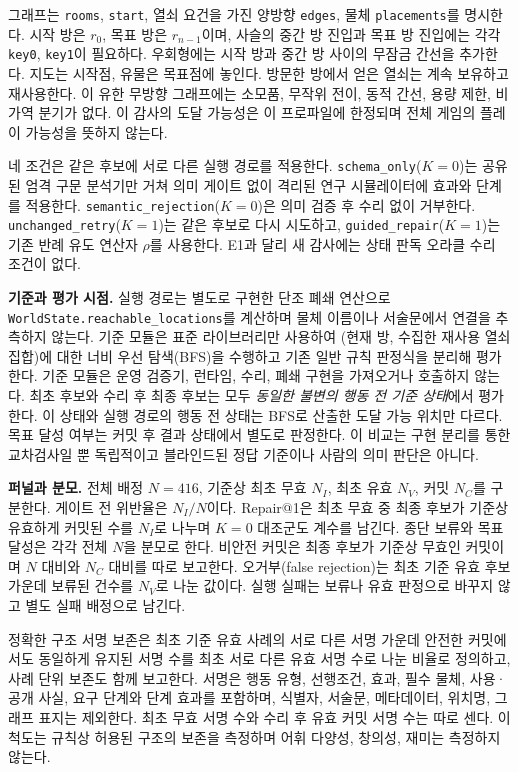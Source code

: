 \documentclass[journal]{IEEEtran}
\begin{document}
그래프는 \texttt{rooms}, \texttt{start}, 열쇠 요건을 가진 양방향 \texttt{edges}, 물체 \texttt{placements}를 명시한다. 시작 방은 $r_0$, 목표 방은 $r_{n-1}$이며, 사슬의 중간 방 진입과 목표 방 진입에는 각각 \texttt{key0}, \texttt{key1}이 필요하다. 우회형에는 시작 방과 중간 방 사이의 무잠금 간선을 추가한다. 지도는 시작점, 유물은 목표점에 놓인다. 방문한 방에서 얻은 열쇠는 계속 보유하고 재사용한다. 이 유한 무방향 그래프에는 소모품, 무작위 전이, 동적 간선, 용량 제한, 비가역 분기가 없다. 이 감사의 도달 가능성은 이 프로파일에 한정되며 전체 게임의 플레이 가능성을 뜻하지 않는다.

네 조건은 같은 후보에 서로 다른 실행 경로를 적용한다. \texttt{schema\_only}($K=0$)는 공유된 엄격 구문 분석기만 거쳐 의미 게이트 없이 격리된 연구 시뮬레이터에 효과와 단계를 적용한다. \texttt{semantic\_rejection}($K=0$)은 의미 검증 후 수리 없이 거부한다. \texttt{unchanged\_retry}($K=1$)는 같은 후보로 다시 시도하고, \texttt{guided\_repair}($K=1$)는 기존 반례 유도 연산자 $\rho$를 사용한다. E1과 달리 새 감사에는 상태 판독 오라클 수리 조건이 없다.

\noindent\textbf{기준과 평가 시점.} 실행 경로는 별도로 구현한 단조 폐쇄 연산으로 \texttt{WorldState.reachable\_locations}를 계산하며 물체 이름이나 서술문에서 연결을 추측하지 않는다. 기준 모듈은 표준 라이브러리만 사용하여 (현재 방, 수집한 재사용 열쇠 집합)에 대한 너비 우선 탐색(BFS)을 수행하고 기존 일반 규칙 판정식을 분리해 평가한다. 기준 모듈은 운영 검증기, 런타임, 수리, 폐쇄 구현을 가져오거나 호출하지 않는다. 최초 후보와 수리 후 최종 후보는 모두 \emph{동일한 불변의 행동 전 기준 상태}에서 평가한다. 이 상태와 실행 경로의 행동 전 상태는 BFS로 산출한 도달 가능 위치만 다르다. 목표 달성 여부는 커밋 후 결과 상태에서 별도로 판정한다. 이 비교는 구현 분리를 통한 교차검사일 뿐 독립적이고 블라인드된 정답 기준이나 사람의 의미 판단은 아니다.

\noindent\textbf{퍼널과 분모.} 전체 배정 $N=416$, 기준상 최초 무효 $N_I$, 최초 유효 $N_V$, 커밋 $N_C$를 구분한다. 게이트 전 위반율은 $N_I/N$이다. Repair@1은 최초 무효 중 최종 후보가 기준상 유효하게 커밋된 수를 $N_I$로 나누며 $K=0$ 대조군도 계수를 남긴다. 종단 보류와 목표 달성은 각각 전체 $N$을 분모로 한다. 비안전 커밋은 최종 후보가 기준상 무효인 커밋이며 $N$ 대비와 $N_C$ 대비를 따로 보고한다. 오거부(false rejection)는 최초 기준 유효 후보 가운데 보류된 건수를 $N_V$로 나눈 값이다. 실행 실패는 보류나 유효 판정으로 바꾸지 않고 별도 실패 배정으로 남긴다.

정확한 구조 서명 보존은 최초 기준 유효 사례의 서로 다른 서명 가운데 안전한 커밋에서도 동일하게 유지된 서명 수를 최초 서로 다른 유효 서명 수로 나눈 비율로 정의하고, 사례 단위 보존도 함께 보고한다. 서명은 행동 유형, 선행조건, 효과, 필수 물체, 사용·공개 사실, 요구 단계와 단계 효과를 포함하며, 식별자, 서술문, 메타데이터, 위치명, 그래프 표지는 제외한다. 최초 무효 서명 수와 수리 후 유효 커밋 서명 수는 따로 센다. 이 척도는 규칙상 허용된 구조의 보존을 측정하며 어휘 다양성, 창의성, 재미는 측정하지 않는다.
\end{document}
